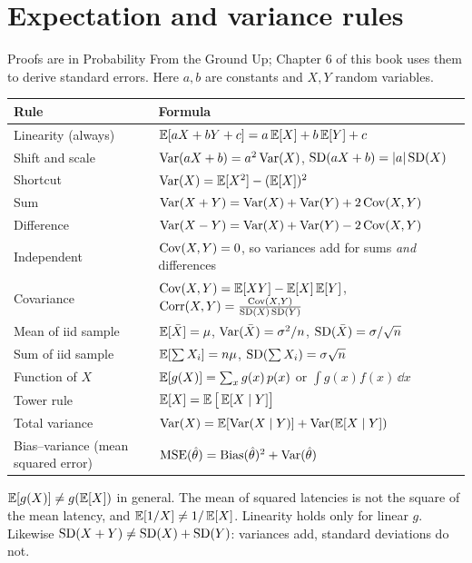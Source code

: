 \section{Expectation and variance rules}

Proofs are in Probability From the Ground Up; Chapter 6 of this book uses them to derive standard errors. Here $a,b$ are constants and $X,Y$ random variables.

\begin{center}
\small
\renewcommand{\arraystretch}{1.35}
\begin{tabular}{@{}p{4.6cm}p{10.2cm}@{}}
\toprule
Rule & Formula \\
\midrule
Linearity (always) & $\E[aX+bY+c]=a\E[X]+b\E[Y]+c$ \\
Shift and scale & $\Var(aX+b)=a^2\Var(X)$, \quad $\SD(aX+b)=\abs{a}\SD(X)$ \\
Shortcut & $\Var(X)=\E[X^2]-(\E[X])^2$ \\
Sum & $\Var(X+Y)=\Var(X)+\Var(Y)+2\Cov(X,Y)$ \\
Difference & $\Var(X-Y)=\Var(X)+\Var(Y)-2\Cov(X,Y)$ \\
Independent & $\Cov(X,Y)=0$, so variances add for sums \emph{and} differences \\
Covariance & $\Cov(X,Y)=\E[XY]-\E[X]\E[Y]$, \quad $\Corr(X,Y)=\frac{\Cov(X,Y)}{\SD(X)\SD(Y)}$ \\
Mean of iid sample & $\E[\Xbar]=\mu$, \quad $\Var(\Xbar)=\sigma^2/n$, \quad $\SD(\Xbar)=\sigma/\sqrt n$ \\
Sum of iid sample & $\E[\textstyle\sum X_i]=n\mu$, \quad $\SD(\sum X_i)=\sigma\sqrt n$ \\
Function of $X$ & $\E[g(X)]=\sum_x g(x)\,p(x)$ or $\int g(x) f(x)\,\dd x$ \\
Tower rule & $\E[X]=\E\big[\E[X\given Y]\big]$ \\
Total variance & $\Var(X)=\E[\Var(X\given Y)]+\Var(\E[X\given Y])$ \\
Bias--variance (mean squared error) & $\MSE(\hat\theta)=\Bias(\hat\theta)^2+\Var(\hat\theta)$ \\
\bottomrule
\end{tabular}
\end{center}

\begin{trapbox}
$\E[g(X)]\ne g(\E[X])$ in general. The mean of squared latencies is not the square of the mean latency, and $\E[1/X]\ne 1/\E[X]$. Linearity holds only for linear $g$. Likewise $\SD(X+Y)\neq\SD(X)+\SD(Y)$: variances add, standard deviations do not.
\end{trapbox}

